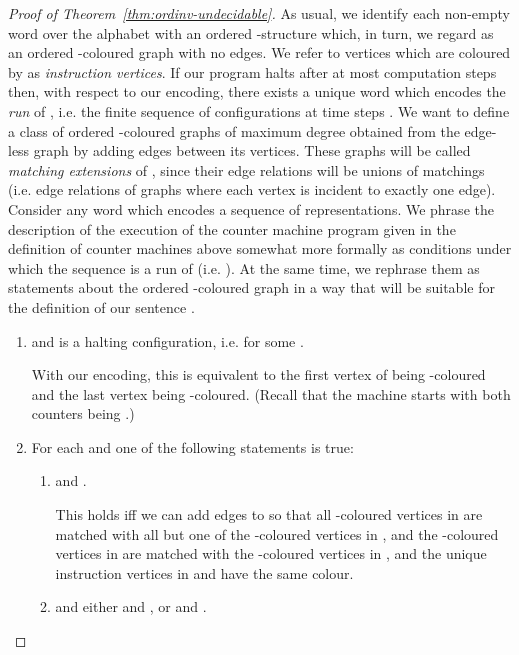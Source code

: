 \documentclass[11pt]{article}
\begin{document}
\begin{proof}[Proof of Theorem~\ref{thm:ordinv-undecidable}]
  As usual, we identify each non-empty word over the alphabet 
  with an ordered -structure which, in turn, we regard as an
  ordered -coloured graph with no edges.  We refer to vertices
  which are coloured by  as \emph{instruction
    vertices}. If our program  halts after at most  computation
  steps then, with respect to our encoding, there exists a unique word
   which encodes the \emph{run} of , i.e. the finite sequence
  of configurations at time steps . We want to define a
  class of ordered -coloured graphs of maximum degree 
  obtained from the edge-less graph  by adding edges between its
  vertices. These graphs will be called \emph{matching extensions} of
  , since their edge relations will be unions of matchings
  (i.e. edge relations of graphs where each vertex is incident to
  exactly one edge).  Consider any word 
  which encodes a sequence of representations. We phrase the
  description of the execution of the counter machine program 
  given in the definition of counter machines above somewhat more
  formally as conditions under which the sequence 
  is a run of  (i.e. ).  At the same time, we rephrase them
  as statements about the ordered -coloured graph  in a way
  that will be suitable for the definition of our sentence .
  \begin{enumerate}
  \item  and  is a halting configuration,
    i.e.  for some .
  
    With our encoding, this is equivalent to the first vertex of  being
    -coloured and the last vertex being -coloured. (Recall
    that the machine starts with both counters being .)
  
  \item For each  and  one of the
    following statements is true:
    \begin{enumerate}
    \item  and .

      This holds iff we can add edges to  so that all
      -coloured vertices in  are matched with
      all but one of the -coloured vertices in
      , and the -coloured vertices in
       are matched with the -coloured
      vertices in , and the unique instruction vertices
      in  and  have the same colour.
      
    \item  and either  and
      , or  and
      .


\end{enumerate}
\end{enumerate}
\end{proof}
\end{document}
